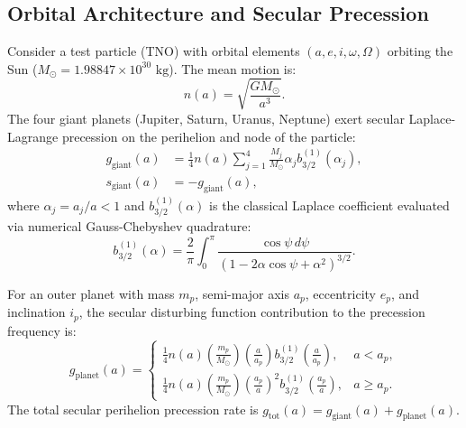 \documentclass[11pt,a4paper]{article}
\begin{document}
\subsection{Orbital Architecture and Secular Precession}
Consider a test particle (TNO) with orbital elements $(a, e, i, \omega, \Omega)$ orbiting the Sun ($M_\odot = 1.98847 \times 10^{30}\text{ kg}$). The mean motion is:
\begin{equation}
n(a) = \sqrt{\frac{G M_\odot}{a^3}}.
\end{equation}
The four giant planets (Jupiter, Saturn, Uranus, Neptune) exert secular Laplace-Lagrange precession on the perihelion and node of the particle:
\begin{align}
g_{\text{giant}}(a) &= \frac{1}{4} n(a) \sum_{j=1}^4 \frac{M_j}{M_\odot} \alpha_j b_{3/2}^{(1)}(\alpha_j), \\
s_{\text{giant}}(a) &= -g_{\text{giant}}(a),
\end{align}
where $\alpha_j = a_j / a < 1$ and $b_{3/2}^{(1)}(\alpha)$ is the classical Laplace coefficient evaluated via numerical Gauss-Chebyshev quadrature:
\begin{equation}
b_{3/2}^{(1)}(\alpha) = \frac{2}{\pi} \int_0^\pi \frac{\cos \psi \, d\psi}{(1 - 2\alpha \cos \psi + \alpha^2)^{3/2}}.
\end{equation}

For an outer planet with mass $m_p$, semi-major axis $a_p$, eccentricity $e_p$, and inclination $i_p$, the secular disturbing function contribution to the precession frequency is:
\begin{equation}
g_{\text{planet}}(a) = 
\begin{cases}
\frac{1}{4} n(a) \left(\frac{m_p}{M_\odot}\right) \left(\frac{a}{a_p}\right) b_{3/2}^{(1)}\left(\frac{a}{a_p}\right), & a < a_p, \\[1.0ex]
\frac{1}{4} n(a) \left(\frac{m_p}{M_\odot}\right) \left(\frac{a_p}{a}\right)^2 b_{3/2}^{(1)}\left(\frac{a_p}{a}\right), & a \ge a_p.
\end{cases}
\end{equation}
The total secular perihelion precession rate is $g_{\text{tot}}(a) = g_{\text{giant}}(a) + g_{\text{planet}}(a)$.
\end{document}

